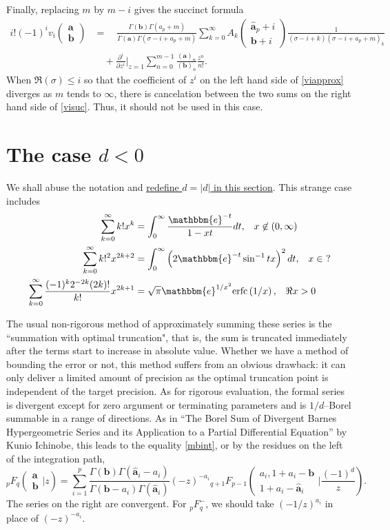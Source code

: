 \documentclass[12pt]{article}
\newcommand{\ee}[0] {\mathbbm{e}}
\numberwithin{equation}{section}
\newcommand{\FF}[6] {{}_{#1}{#2}_{#3} \left( \begin{array}{c} #4 \\ #5 \end{array} \Big| {#6}  \right)}
\newcommand{\ARG}[2] {\left( \begin{array}{c} #1 \\ #2 \end{array} \right)}
\begin{document}
Finally, replacing $m$ by $m-i$ gives the succinct formula
\begin{equation}
\label{visuc}
\begin{aligned}
i! (-1)^i v_i \ARG{\mathbf{a}}{\mathbf{b}} &= \quad\frac{\Gamma(\mathbf{b}) \Gamma(a_p+m)}{\Gamma(\mathbf{a}) \Gamma(\sigma-i+a_p+m)} \sum_{k=0}^{\infty} A_k \ARG{\hat{\mathbf{a}}_p+i}{\mathbf{b}+i} \frac{1}{(\sigma-i+k) (\sigma-i+a_p+m)_k}\\
&\quad +\frac{\partial^i}{\partial z^i} \Big|_{z=1} \sum_{n=0}^{m-1}{\frac{(\mathbf{a})_{n}}{(\mathbf{b})_{n}} \frac{z^n}{n!}}\text{.}
\end{aligned}
\end{equation}
When $\Re(\sigma) \le i$ so that the coefficient of $z^i$ on the left hand side of \eqref{viapprox} diverges as $m$ tends to $\infty$, there is cancelation between the two sums on the right hand side of \eqref{visuc}. Thus, it should not be used in this case.

\section{The case $d<0$}
\label{section_negd}
We shall abuse the notation and \underline{redefine $d=|d|$ in this section}. This strange case includes
\begin{align*}
\sum_{k=0}^{\infty} k! x^k &= \int_{0}^{\infty} \frac{\ee^{-t}}{1-x t} dt\text{,} \quad x \not \in (0,\infty)\\
\sum_{k=0}^{\infty} k!^2 x^{2k+2} &= \int_{0}^{\infty} \left(2 \ee^{-t} \sin ^{-1}tx\right)^2 dt\text{,} \quad x \in \ ?\\
\sum_{k=0}^{\infty}\frac{(-1)^k 2^{-2 k} (2 k)!}{k!} x^{2 k+1} &=\sqrt{\pi } \ee^{1/x^2}
   \text{erfc}\left(1/x\right)\text{,} \quad \Re x > 0
\end{align*}

The usual non-rigorous method of approximately summing these series is the ``summation with optimal truncation", that is, the sum is truncated immediately after the terms start to increase in absolute value. Whether we have a method of bounding the error or not, this method suffers from an obvious drawback: it can only deliver a limited amount of precision as the optimal truncation point is independent of the target precision. As for rigorous evaluation, the formal series is divergent except for zero argument or terminating parameters and is $1/d$--Borel summable in a range of directions. As in ``The Borel Sum of Divergent Barnes Hypergeometric Series and its Application to a Partial Differential Equation'' by Kunio Ichinobe, this leads to the equality \eqref{mbint}, or by the residues on the left of the integration path,
\begin{equation}
\label{divrecp}
\FF{p}{F}{q}{\mathbf{a}}{\mathbf{b}}{z} = \sum_{i=1}^{p} \frac{\Gamma(\mathbf{b}) \Gamma(\hat{\mathbf{a}}_i-a_i)}{\Gamma(\mathbf{b}-a_i) \Gamma(\hat{\mathbf{a}}_i)} (-z)^{-a_i} \FF{q+1}{F}{p-1}{a_i,1+a_i-\mathbf{b}}{1+a_i-\hat{\mathbf{a}}_i}{\frac{(-1)^d}{z}}\text{.}
\end{equation}
The series on the right are convergent. For ${}_p^{\,} F_{q}^{-}$, we should take $(-1/z)^{a_i}$ in place of $(-z)^{-a_i}$.
\end{document}
